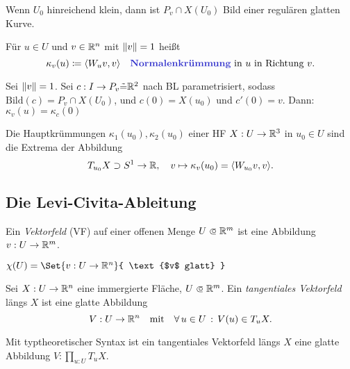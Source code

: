 \documentclass{cheat-sheet}
\newcommand{\Bild}{\mathrm{Bild}} %
\begin{document}
\begin{satz}
  Wenn $U_0$ hinreichend klein, dann ist $P_v \cap X(U_0)$ Bild einer regulären glatten Kurve.
\end{satz}

\begin{defn}
  Für $u \in U$ und $v \in \mathbb{R}^n$ mit $\lVert v\rVert = 1$ heißt
  \[
    \kappa_v(u) \coloneqq \langle W_u v, v \rangle
    \quad \text{\emph{Normalenkrümmung} in $u$ in Richtung $v$}.
  \]
\end{defn}

\begin{samepage}

\begin{bem}
  Sei $\lVert v\rVert = 1$. Sei $c : I \to P_v \tilde{=} \mathbb{R}^2$ nach BL parametrisiert, sodass $\Bild(c) = P_v \cap X(U_0)$, und $c(0) = X(u_0)$ und $c'(0) = v$. Dann: $\kappa_v(u) = \kappa_c(0)$
\end{bem}

\begin{satz}
  Die Hauptkrümmungen $\kappa_1(u_0), \kappa_2(u_0)$ einer HF $X : U \to \mathbb{R}^3$ in $u_0 \in U$ sind die Extrema der Abbildung
  \[ T_{u_0} X \supset S^1 \to \mathbb{R}, \quad v \mapsto \kappa_v(u_0) = \langle W_{u_0} v, v \rangle. \]
\end{satz}

\subsection{Die Levi-Civita-Ableitung}

\end{samepage}

\begin{defn}
  Ein \emph{Vektorfeld} (VF) auf einer offenen Menge $U \opn \R^m$ ist eine Abbildung $v : U \to \mathbb{R}^m$.
\end{defn}

\begin{nota}
  $\chi(U) = \Set{ v : U \to \R^n }{ \text{$v$ glatt} }$
\end{nota}

\begin{defn}
  Sei $X : U \to \mathbb{R}^n$ eine immergierte Fläche, $U \opn \R^m$. Ein \emph{tangentiales Vektorfeld} längs $X$ ist eine glatte Abbildung
  \[
    V : U \to \mathbb{R}^n
    \quad \text{mit} \quad
    \forall \, {u \in U} \,:\, V(u) \in T_u X.
  \]
\end{defn}

\begin{bem}
  Mit typtheoretischer Syntax ist ein tangentiales Vektorfeld längs $X$ eine glatte Abbildung $V : \prod_{u : U} T_u X$.
\end{bem}
\end{document}
